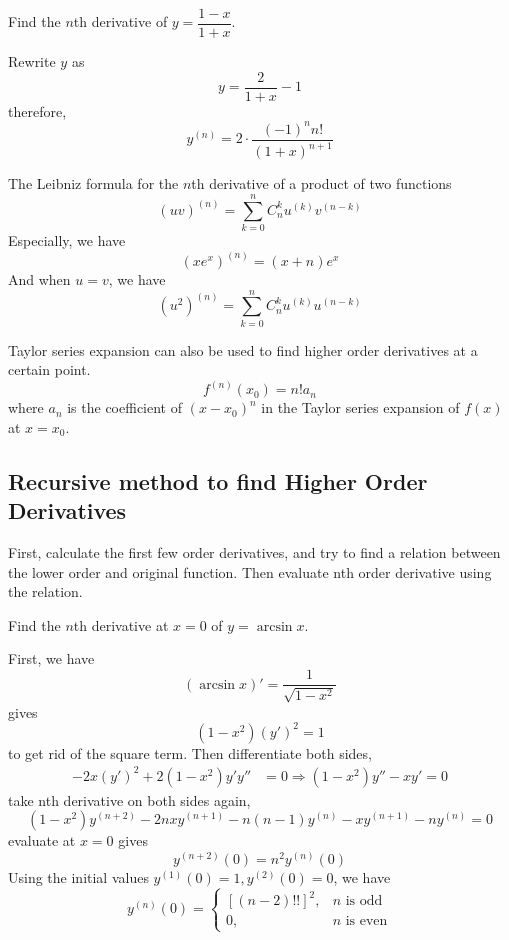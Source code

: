 \documentclass{overview}
\begin{document}
\begin{example}
	Find the $n$th derivative of $y = \dfrac{1-x}{1+x}$.
	\begin{answer}
		Rewrite $y$ as
		\[
			y = \frac{2}{1+x} - 1
		\]
		therefore,
		\[
			y^{(n)} = 2 \cdot \frac{(-1)^{n} n!}{(1+x)^{n+1}}
		\]
	\end{answer}
\end{example}

The Leibniz formula for the $n$th derivative of a product of two functions
\[
	(uv)^{(n)} = \sum_{k=0}^{n} C_n^k u^{(k)} v^{(n-k)}
\] 
Especially, we have
\[
	(xe^{x})^{(n)} = (x+n)e^{x}
\] 
And when $u = v$, we have
\[
	(u^2)^{(n)} = \sum_{k=0}^{n} C_n^k u^{(k)} u^{(n-k)}
\]

Taylor series expansion can also be used to find higher order derivatives
at a certain point.
\[
	f^{(n)}(x_0) = n!a_n
\] 
where $a_n$ is the coefficient of $(x - x_0)^{n}$ in the Taylor series expansion
of $f(x)$ at $x = x_0$.

\subsection{Recursive method to find Higher Order Derivatives}
First, calculate the first few order derivatives, and try to find a relation
between the lower order and original function. Then evaluate nth order derivative
using the relation.
\begin{example}
	Find the $n$th derivative at $x=0$ of $y = \arcsin x$.
	\begin{answer}
		First, we have
		\[
			(\arcsin x)' = \frac{1}{\sqrt{1-x^2}}
		\]
		gives
		\[
			(1-x^2)(y')^2 = 1
		\]
		to get rid of the square term. Then differentiate both sides,
		\[
		\begin{aligned}
			-2x(y')^2 + 2(1-x^2)y'y'' &= 0
			\Rightarrow (1-x^2)y''- xy' = 0
		\end{aligned}
		\]
		take nth derivative on both sides again,
		\[
			(1-x^2)y^{(n+2)} - 2n x y^{(n+1)} - n(n-1) y^{(n)} - x y^{(n+1)} - n y^{(n)} = 0
		\]
		evaluate at $x = 0$ gives
		\[
			y^{(n+2)}(0) = n^2 y^{(n)}(0)
		\]
		Using the initial values $y^{(1)}(0) = 1, y^{(2)}(0) = 0$, we have
		\[
			y^{(n)}(0) = \begin{cases}
				[(n-2)!!]^2, & n \text{ is odd} \\
				0, & n \text{ is even}
			\end{cases}
		\]
	\end{answer}
\end{example}
\end{document}
